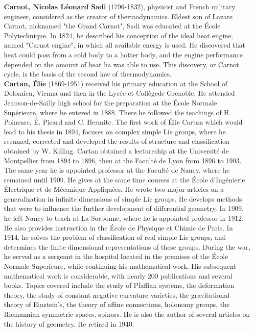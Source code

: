 \textbf{Carnot, Nicolas Léonard Sadi} (1796-1832), physicist and French military engineer, considered as the creator of thermodynamics. Eldest son of Lazare Carnot, nicknamed "the Grand Carnot", Sadi was educated at the École Polytechnique. In 1824, he described his conception of the ideal heat engine, named "Carnot engine", in which all available energy is used. He discovered that heat could pass from a cold body to a hotter body, and the engine performance depended on the amount of heat ha was able to use. This discovery, or Carnot cycle, is the basis of the second law of thermodynamics.\\

\textbf{Cartan, Élie} (1869-1951) received his primary education at the School of Dolomieu, Vienna and then in the Lycée et Collègede Grenoble. He attended Jeanson-de-Sailly high school for the preparation at the École Normale Supérieure, where he entered in 1888. There he followed the teachings of H. Poincare, É. Picard and C. Hermite. The first work of Élie Cartan which would lead to his thesis in 1894, focuses on complex simple Lie groups, where he resumed, corrected and developed the results of structure and classification obtained by W. Killing. Cartan obtained a lectureship at the Université de Montpellier from 1894 to 1896, then at the Faculté de Lyon from 1896 to 1903. The same year he is appointed professor at the Faculté de Nancy, where he remained until 1909. He gives at the same time courses at the École d'Ingénierie Électrique et de Mécanique Appliquées. He wrote two major articles on a generalization in infinite dimensions of simple Lie groups. He develops methods that were to influence the further development of differential geometry. In 1909, he left Nancy to teach at La Sorbonne, where he is appointed professor in 1912. He also provides instruction in the École de Physique et Chimie de Paris. In 1914, he solves the problem of classification of real simple Lie groups, and determines the finite dimensional representations of these groups. During the war, he served as a sergeant in the hospital located in the premises of the École Normale Superieure, while continuing his mathematical work. His subsequent mathematical work is considerable, with nearly 200 publications and several books. Topics covered include the study of Pfaffian systems, the deformation theory, the study of constant negative curvature varieties, the gravitational theory of Einstein's, the theory of affine connections, holonomy groups, the Riemannian symmetric spaces, spinors. He is also the author of several articles on the history of geometry. He retired in 1940.



